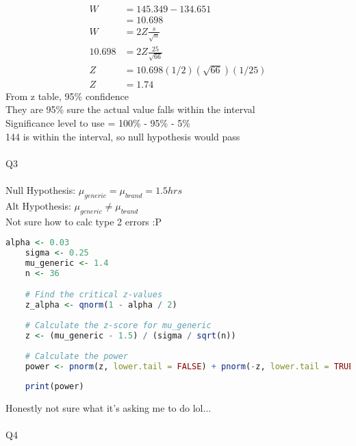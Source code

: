 \documentclass{article}
\begin{document}
\begin{equation*}
\begin{split}
    W & = 145.349 - 134.651\\
    & = 10.698\\
    W & =  2Z\frac{s}{\sqrt{n}}\\
    10.698 & = 2Z\frac{25}{\sqrt{66}}\\
    Z & = 10.698 (1/2) (\sqrt{66}) (1/25)\\
    Z & = 1.74
\end{split}
\end{equation*}
From z table, 95\% confidence\\
They are 95\% sure the actual value falls within the interval\\
Significance level to use = 100\% - 95\% - 5\%\\
144 is within the interval, so null hypothesis would pass\\\\

Q3\\\\
Null Hypothesis: $\mu_{generic} = \mu_{brand} = 1.5hrs$\\
Alt Hypothesis: $\mu_{generic} \neq \mu_{brand}$ \\
Not sure how to calc type 2 errors :P\\

\begin{lstlisting}[language=R]
    alpha <- 0.03
    sigma <- 0.25
    mu_generic <- 1.4
    n <- 36

    # Find the critical z-values
    z_alpha <- qnorm(1 - alpha / 2)
    
    # Calculate the z-score for mu_generic
    z <- (mu_generic - 1.5) / (sigma / sqrt(n))
    
    # Calculate the power
    power <- pnorm(z, lower.tail = FALSE) + pnorm(-z, lower.tail = TRUE)
    
    print(power)
\end{lstlisting}

Honestly not sure what it's asking me to do lol...\\\\

Q4\\\\
\end{document}
